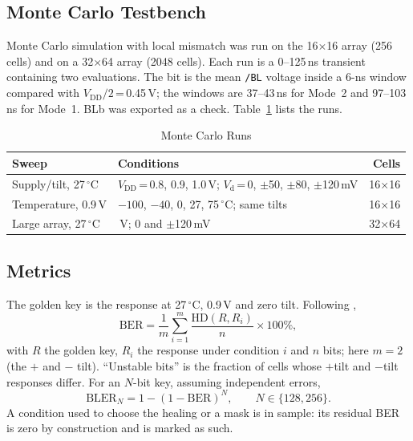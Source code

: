 \documentclass[journal]{IEEEtran}
\newcommand{\Vd}{V_{\mathrm{d}}}
\newcommand{\VDD}{V_{\mathrm{DD}}}
\begin{document}
\subsection{Monte Carlo Testbench}
Monte Carlo simulation with local mismatch was run on the 16$\times$16 array (256 cells) and on a 32$\times$64 array (2048 cells). Each run is a 0--125\,ns transient containing two evaluations. The bit is the mean \texttt{/BL} voltage inside a 6-ns window compared with $\VDD/2$\,=\,0.45\,V; the windows are 37--43\,ns for Mode~2 and 97--103\,ns for Mode~1. BLb was exported as a check. Table~\ref{tab:runs} lists the runs.

\begin{table}[!t]
\caption{Monte Carlo Runs}
\label{tab:runs}
\centering
\footnotesize
\begin{tabular}{@{}>{\raggedright\arraybackslash}p{}>{\raggedright\arraybackslash}p{}r@{}}
\toprule
Sweep & Conditions & Cells \\
\midrule
Supply/tilt, 27\,$^\circ$C & $\VDD$\,=\,0.8, 0.9, 1.0\,V; $\Vd$\,=\,0, $\pm$50, $\pm$80, $\pm$120\,mV & 16$\times$16 \\
Temperature, 0.9\,V & $-100$, $-40$, 0, 27, 75\,$^\circ$C; same tilts & 16$\times$16 \\
Large array, 27\,$^\circ$C & 0.9\,V; 0 and $\pm$120\,mV & 32$\times$64 \\
\bottomrule
\end{tabular}
\end{table}

\subsection{Metrics}
The golden key is the response at 27\,$^\circ$C, 0.9\,V and zero tilt. Following \cite{chen2024},
\begin{equation}
\mathrm{BER}=\frac{1}{m}\sum_{i=1}^{m}\frac{\mathrm{HD}\left(R,R_i\right)}{n}\times100\%,
\end{equation}
with $R$ the golden key, $R_i$ the response under condition $i$ and $n$ bits; here $m=2$ (the $+$ and $-$ tilt). ``Unstable bits'' is the fraction of cells whose $+$tilt and $-$tilt responses differ. For an $N$-bit key, assuming independent errors,
\begin{equation}
\mathrm{BLER}_N = 1-(1-\mathrm{BER})^{N},\qquad N\in\{128,256\}.
\end{equation}
A condition used to choose the healing or a mask is in sample: its residual BER is zero by construction and is marked as such.
\end{document}
